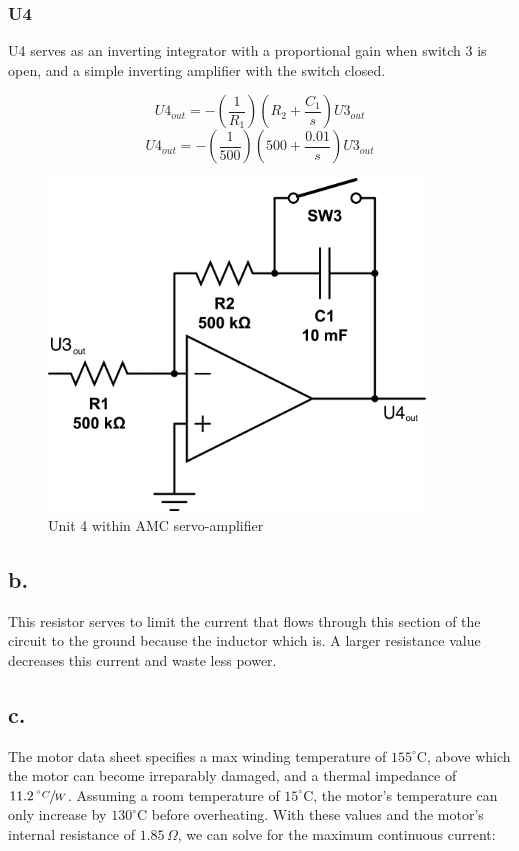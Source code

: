 \documentclass{article}
\theoremstyle{plain}
\theoremstyle{definition}
\theoremstyle{remark}
\begin{document}
\subsubsection*{U4}

U4 serves as an inverting integrator with a proportional gain when switch 3 is open, and a simple inverting amplifier with the switch closed.

$$U4_{out} = - \left( \frac{1}{R_1} \right) \left( R_2 + \frac{C_1}{s} \right) U3_{out} $$
$$U4_{out} = - \left( \frac{1}{500} \right) \left( 500 + \frac{0.01}{s} \right) U3_{out} $$

\begin{figure}[htb]
\begin{center}
\includegraphics[width = 10cm]{q1a_u4.png}
\caption{Unit 4 within AMC servo-amplifier}
\label{q1_au4}
\end{center}
\end{figure}

\subsection*{b.}
This resistor serves to limit the current that flows through this section of the circuit to the ground because the inductor which is.  A larger resistance value decreases this current and waste less power.

\subsection*{c.}
The motor data sheet specifies a max winding temperature of $155^\circ$C, above which the motor can become irreparably damaged, and a thermal impedance of $11.2 \, \sfrac{^\circ C}{W}$.  Assuming a room temperature of $15^\circ$C, the motor's temperature can only increase by $130^\circ$C before overheating. With these values and the motor's internal resistance of $1.85 \, \Omega$, we can solve for the maximum continuous current:
\end{document}
